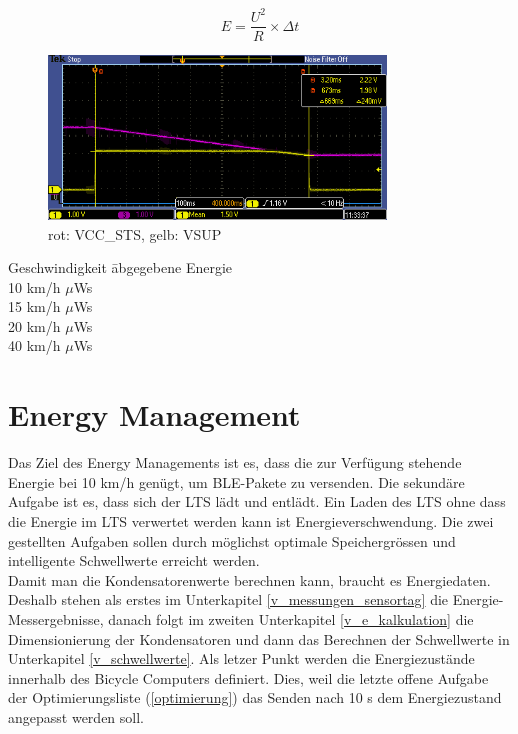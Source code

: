 \begin{equation}
	E = \frac{U^2}{R}  \times \Delta t
\end{equation}

\begin{figure}[ht]
  \includegraphics[width=0.80\textwidth]{3Vorgehen/imag/EnergieEMChip15kmh.PNG} 
  \caption{rot: VCC\_STS, gelb: VSUP}
   \label{EnergieEMChip15kmh} 
\end{figure}



\label{tab:em_out_zsm}
\begin{tabbing}
    Geschwindigkeit   	\quad\= abgegebene Energie    \\[0.8ex]
    10 km/h		         $\mu$Ws\\
	15 km/h		         $\mu$Ws\\
	20 km/h		         $\mu$Ws\\
	40 km/h		         $\mu$Ws\\
\end{tabbing}

\section{Energy Management}

Das Ziel des Energy Managements ist es, dass die zur Verfügung stehende Energie bei 10 km/h genügt, um BLE-Pakete zu versenden. Die sekundäre Aufgabe ist es, dass sich der LTS lädt und entlädt. Ein Laden des LTS ohne dass die Energie im LTS verwertet werden kann ist Energieverschwendung. Die zwei gestellten Aufgaben sollen durch möglichst optimale Speichergrössen und intelligente Schwellwerte erreicht werden.\\

Damit man die Kondensatorenwerte berechnen kann, braucht es Energiedaten. Deshalb stehen als erstes im Unterkapitel \ref{v_messungen_sensortag} die Energie-Messergebnisse, danach folgt im zweiten Unterkapitel \ref{v_e_kalkulation} die Dimensionierung der Kondensatoren und dann das Berechnen der Schwellwerte in Unterkapitel \ref{v_schwellwerte}. Als letzer Punkt werden die Energiezustände innerhalb des Bicycle Computers definiert. Dies, weil die letzte offene Aufgabe der Optimierungsliste (\ref{optimierung}) das Senden nach 10 s dem Energiezustand angepasst werden soll.


